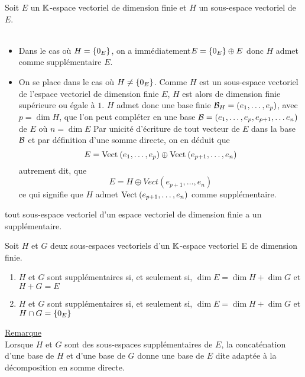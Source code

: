 \begin{dem}
    Soit \(E\) un \(\K\)-espace vectoriel de dimension finie et \(H\) un sous-espace vectoriel de \(E\).\\~\\
    \begin{itemize}
        \item Dans le cas où \(H = \accol{0_E }\), on a immédiatement\( E = \accol{0_E }\oplus E\) donc \(H\) admet comme supplémentaire \(E\).
        \item On se place dans le cas où \(H\neq \accol{0_E }\).
            Comme \(H\) est un sous-espace vectoriel de l’espace vectoriel de dimension finie \(E\), \(H\) est alors de dimension finie supérieure ou égale à \(1\). \(H\) admet donc une base finie \(\cal{B}_H = (e_1, \dots , e_p)\), avec \(p = \dim H\), que l’on peut compléter en une base \(\cal{B} = (e_1, \dots , e_p, e_{p+1}, \dots e_n)\) de \(E\) où \(n = \dim E\)
            Par unicité d’écriture de tout vecteur de \(E\) dans la base \(\cal{B}\) et par définition d’une somme directe, on en déduit que
            \[E = \Vect{e_1, \dots , e_p} \oplus \Vect{e_{p+1}, \dots , e_n}\]
            autrement dit, que
            \[E = H \oplus Vect (e_{p+1}, \dots , e_n)\]
            ce qui signifie que \(H\) admet \(\Vect{e_{p+1}, \dots , e_n}\) comme supplémentaire.
    \end{itemize}
    \conclusion tout sous-espace vectoriel d’un espace vectoriel de dimension finie a un supplémentaire.
\end{dem}

\begin{defprop}
    Soit \(H\) et \(G\) deux sous-espaces vectoriels d’un \(\K\)-espace vectoriel E de dimension finie.\\
    \begin{enumerate}
        \item \(H\) et \(G\) sont supplémentaires si, et seulement si, \(\dim E = \dim H + \dim G\) et \(H + G = E\)
        \item \(H\) et \(G\) sont supplémentaires si, et seulement si, \(\dim E = \dim H + \dim G\) et \(H \inter G = \accol{0_E}\)
    \end{enumerate}
    \underline{Remarque}\\
        Lorsque \(H\) et \(G\) sont des sous-espaces supplémentaires de \(E\), la concaténation d’une base de \(H\) et d’une base de \(G\) donne une base de \(E\) dite adaptée à la décomposition en somme directe.
\end{defprop}
